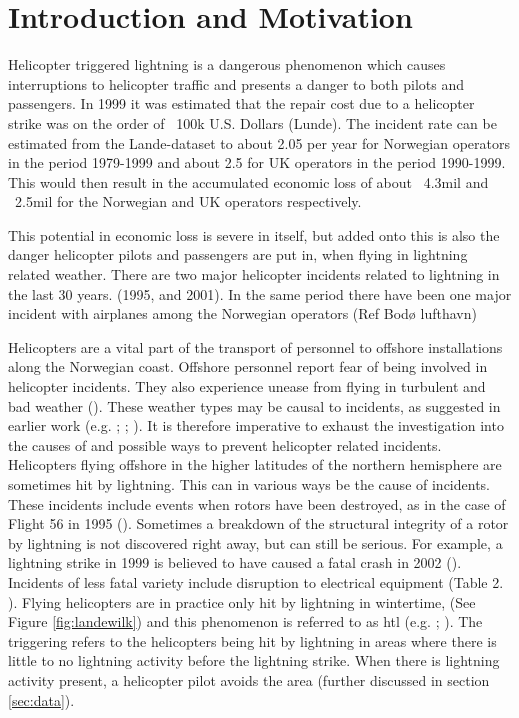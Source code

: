\chapter{Introduction and Motivation}\label{ch:introduction}


Helicopter triggered lightning is a dangerous phenomenon which causes interruptions to helicopter traffic and presents a danger to both pilots and passengers. In 1999 it was estimated that the repair cost due to a helicopter strike was on the order of  ~100k U.S. Dollars (Lunde). The incident rate can be estimated from the Lande-dataset to about 2.05 per year for Norwegian operators in the period 1979-1999 and about 2.5 for UK operators in the period 1990-1999. This would then result in the accumulated economic loss of about ~4.3mil and ~2.5mil for the Norwegian and UK operators respectively.

This potential in economic loss is severe in itself, but added onto this is also the danger helicopter pilots and passengers are put in, when flying in lightning related weather. There are two major helicopter incidents related to lightning in the last 30 years. (1995, and 2001). In the same period there have been one major incident with airplanes among the Norwegian operators (Ref Bodø lufthavn)

Helicopters are a vital part of the transport of personnel to offshore installations along the Norwegian coast. Offshore personnel report fear of being involved in helicopter incidents. They also experience unease from flying in turbulent and bad weather (\cite{wasilewska2019}). These weather types may be causal to incidents, as suggested in earlier work (e.g. \cite{lande1999}; \cite{wilkinson2013}; \cite{smart1997}). It is therefore imperative to exhaust the investigation into the causes of and possible ways to prevent helicopter related incidents. 
Helicopters flying offshore in the higher latitudes of the northern hemisphere are sometimes hit by lightning. This can in various ways be the cause of incidents. These incidents include events when rotors have been destroyed, as in the case of Flight 56 in 1995 (\cite{smart1997}). Sometimes a breakdown of the structural integrity of a rotor by lightning is not discovered right away, but can still be serious. For example, a lightning strike in 1999 is believed to have caused a fatal crash in 2002 (\cite{smart2005}). Incidents of less fatal variety include disruption to electrical equipment (Table 2. \cite{uman2003}). Flying helicopters are in practice only hit by lightning in wintertime, (See Figure \ref{fig:landewilk}) and this phenomenon is referred to as \acrfull{htl} (e.g. \cite{lande1999}; \cite{wilkinson2013}). The triggering refers to the helicopters being hit by lightning in areas where there is little to no lightning activity before the lightning strike. When there is lightning activity present, a helicopter pilot avoids the area (further discussed in section \ref{sec:data}).


